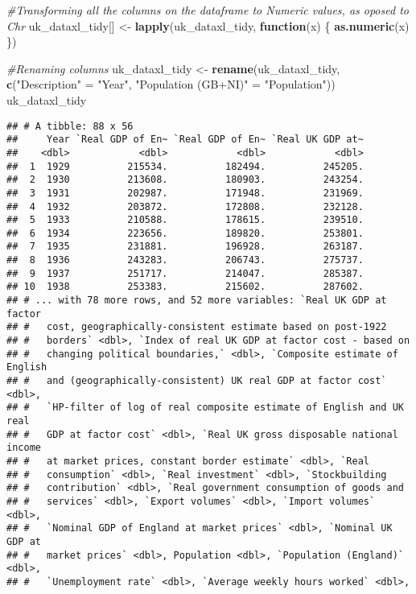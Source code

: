 \documentclass[]{article}
\newenvironment{Shaded}{\begin{snugshade}}{\end{snugshade}}
\newcommand{\KeywordTok}[1]{\textcolor[rgb]{0.13,0.29,0.53}{\textbf{#1}}}
\newcommand{\StringTok}[1]{\textcolor[rgb]{0.31,0.60,0.02}{#1}}
\newcommand{\CommentTok}[1]{\textcolor[rgb]{0.56,0.35,0.01}{\textit{#1}}}
\newcommand{\ControlFlowTok}[1]{\textcolor[rgb]{0.13,0.29,0.53}{\textbf{#1}}}
\newcommand{\NormalTok}[1]{#1}
\begin{document}
\begin{Shaded}
\begin{Highlighting}[]
\CommentTok{#Transforming all the columns on the dataframe to Numeric values, as oposed to Chr}
\NormalTok{uk_dataxl_tidy[] <-}\StringTok{ }\KeywordTok{lapply}\NormalTok{(uk_dataxl_tidy, }\ControlFlowTok{function}\NormalTok{(x) \{}
    \KeywordTok{as.numeric}\NormalTok{(x)}
\NormalTok{\})}

\CommentTok{#Renaming columns}
\NormalTok{uk_dataxl_tidy <-}\StringTok{ }\KeywordTok{rename}\NormalTok{(uk_dataxl_tidy, }\KeywordTok{c}\NormalTok{(}\StringTok{"Description"}\NormalTok{ =}\StringTok{ "Year"}\NormalTok{, }\StringTok{"Population (GB+NI)"}\NormalTok{ =}\StringTok{ "Population"}\NormalTok{))}
\NormalTok{uk_dataxl_tidy}
\end{Highlighting}
\end{Shaded}

\begin{verbatim}
## # A tibble: 88 x 56
##     Year `Real GDP of En~ `Real GDP of En~ `Real UK GDP at~
##    <dbl>            <dbl>            <dbl>            <dbl>
##  1  1929          215534.          182494.          245205.
##  2  1930          213608.          180903.          243254.
##  3  1931          202987.          171948.          231969.
##  4  1932          203872.          172808.          232128.
##  5  1933          210588.          178615.          239510.
##  6  1934          223656.          189820.          253801.
##  7  1935          231881.          196928.          263187.
##  8  1936          243283.          206743.          275737.
##  9  1937          251717.          214047.          285387.
## 10  1938          253383.          215602.          287602.
## # ... with 78 more rows, and 52 more variables: `Real UK GDP at factor
## #   cost, geographically-consistent estimate based on post-1922
## #   borders` <dbl>, `Index of real UK GDP at factor cost - based on
## #   changing political boundaries,` <dbl>, `Composite estimate of English
## #   and (geographically-consistent) UK real GDP at factor cost` <dbl>,
## #   `HP-filter of log of real composite estimate of English and UK real
## #   GDP at factor cost` <dbl>, `Real UK gross disposable national income
## #   at market prices, constant border estimate` <dbl>, `Real
## #   consumption` <dbl>, `Real investment` <dbl>, `Stockbuilding
## #   contribution` <dbl>, `Real government consumption of goods and
## #   services` <dbl>, `Export volumes` <dbl>, `Import volumes` <dbl>,
## #   `Nominal GDP of England at market prices` <dbl>, `Nominal UK GDP at
## #   market prices` <dbl>, Population <dbl>, `Population (England)` <dbl>,
## #   `Unemployment rate` <dbl>, `Average weekly hours worked` <dbl>,

\end{verbatim}
\end{document}
